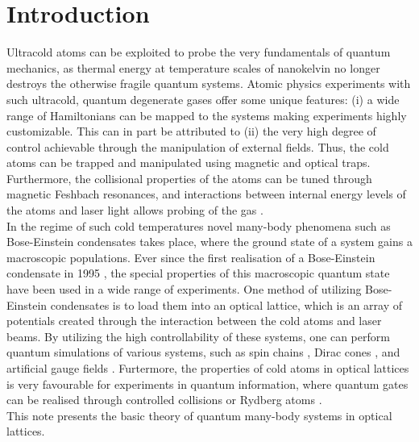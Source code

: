 \chapter{Introduction}

Ultracold atoms can be exploited to probe the very fundamentals of quantum mechanics, as thermal energy at temperature scales of nanokelvin no longer destroys the otherwise fragile quantum systems. Atomic physics experiments with such ultracold, quantum degenerate gases offer some unique features: (i) a wide range of Hamiltonians can be mapped to the systems making experiments highly customizable. This can in part be attributed to (ii) the very high degree of control achievable through the manipulation of external fields. Thus, the cold atoms can be trapped and manipulated using magnetic and optical traps. Furthermore, the collisional properties of the atoms can be tuned through magnetic Feshbach resonances, and interactions between internal energy levels of the atoms and laser light allows probing of the gas \cite{JakschZoller, Bloch2012}.\\
In the regime of such cold temperatures novel many-body phenomena such as Bose-Einstein condensates takes place, where the ground state of a system gains a macroscopic populations. Ever since the first realisation of a Bose-Einstein condensate in 1995 \cite{WiemanCornall1995}, the special properties of this macroscopic quantum state have been used in a wide range of experiments. One method of utilizing Bose-Einstein condensates is to load them into an optical lattice, which is an array of potentials created through the interaction between the cold atoms and laser beams. By utilizing the high controllability of these systems, one can perform quantum simulations of various systems, such as spin chains \cite{Simon2011}, Dirac cones \cite{Tarruell2012}, and artificial gauge fields \cite{Dalibard2011}. Furtermore, the properties of cold atoms in optical lattices is very favourable for experiments in quantum information, where quantum gates can be realised through controlled collisions \cite{Zoller1999} or Rydberg atoms \cite{Molmer2010}.\\

This note presents the basic theory of quantum many-body systems in optical lattices.
\newpage